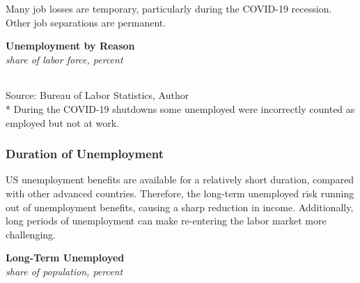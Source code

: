 \documentclass{report}
\begin{document}
{\begin{minipage}{0.76\textwidth}
\small Many job losses are temporary, particularly during the COVID-19 recession. Other job separations are permanent. 
\vspace{1mm}

\normalsize \textbf{Unemployment by Reason}\\
\footnotesize{\textit{share of labor force, percent}}\\
 \setlength{\tabcolsep}{1.2pt} \color{black!90}
	{\renewcommand{\arraystretch}{1.5}
		\begin{tabular}{p{36mm} R{9mm} R{9mm} R{9mm} R{9mm} R{9mm} 
		   R{9mm} R{9mm} R{9mm} R{9mm}}
			  \hline
		\end{tabular}}\vspace{-1mm}
		
\footnotesize{Source: Bureau of Labor Statistics, Author}\\
\footnotesize{* During the COVID-19 shutdowns some unemployed were incorrectly counted as employed but not at work.}
\end{minipage}
\newpage
\begin{minipage}{0.76\textwidth} 
\subsubsection*{Duration of Unemployment}
\small US unemployment benefits are available for a relatively short duration, compared with other advanced countries. Therefore, the long-term unemployed risk running out of unemployment benefits, causing a sharp reduction in income. Additionally, long periods of unemployment can make re-entering the labor market more challenging. 


\vspace{1mm}

\normalsize \textbf{Long-Term Unemployed}\\
\footnotesize{\textit{share of population, percent}}
\vspace{3.2cm}


\end{minipage}}
\end{document}
